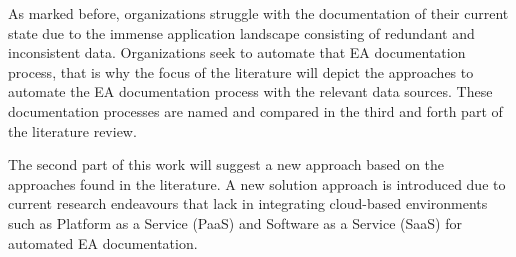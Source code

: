 As marked before, organizations struggle with the documentation of their current state due to the immense application landscape consisting of redundant and inconsistent data. Organizations seek to automate that EA documentation process, that is why the focus of the literature will depict the approaches to automate the EA documentation process with the relevant data sources. These documentation processes are named and compared in the third and forth part of the literature review.

The second part of this work will suggest a new approach based on the approaches found in the literature. A new solution approach is introduced due to current research endeavours that lack in integrating cloud-based environments such as Platform as a Service (PaaS) and Software as a Service (SaaS) for automated EA documentation. 

